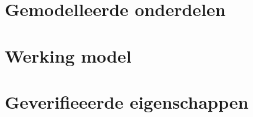 \documentclass{article}
\begin{document}


\section {Gemodelleerde onderdelen}



\section {Werking model}



\section {Geverifieeerde eigenschappen}





\newpage


\end{document}
